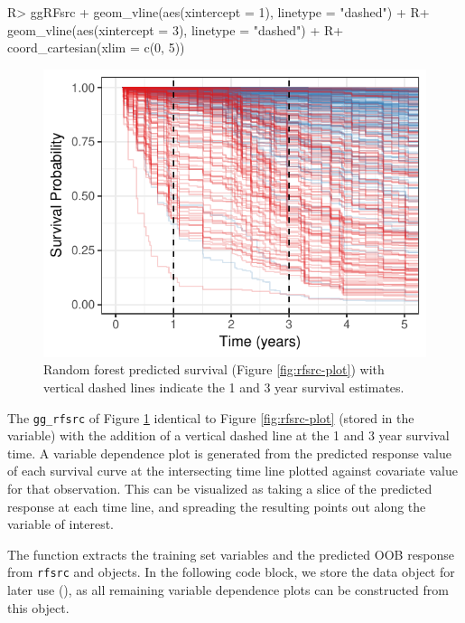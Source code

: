 \documentclass[article]{jss}
\begin{document}
\begin{Schunk}
\begin{Sinput}
R> ggRFsrc + geom_vline(aes(xintercept = 1), linetype = "dashed") +
R+    geom_vline(aes(xintercept = 3), linetype = "dashed") +
R+   coord_cartesian(xlim = c(0, 5))
\end{Sinput}
\begin{figure}[!htb]

{\centering \includegraphics{fig-rfs/rfs-rfsrc-plot3Mnth-1} 

}

\caption{Random forest predicted survival (Figure \ref{fig:rfsrc-plot}) with vertical dashed lines indicate the 1 and 3 year survival estimates.}\label{fig:rfsrc-plot3Mnth}
\end{figure}
\end{Schunk}

The \texttt{gg\_rfsrc} of Figure \ref{fig:rfsrc-plot3Mnth} identical to
Figure \ref{fig:rfsrc-plot} (stored in the  variable) with
the addition of a vertical dashed line at the 1 and 3 year survival
time. A variable dependence plot is generated from the predicted
response value of each survival curve at the intersecting time line
plotted against covariate value for that observation. This can be
visualized as taking a slice of the predicted response at each time
line, and spreading the resulting points out along the variable of
interest.

The  function extracts the training set variables and
the predicted OOB response from \texttt{rfsrc} and 
objects. In the following code block, we store the 
data object for later use (), as all remaining variable
dependence plots can be constructed from this object.
\end{document}
